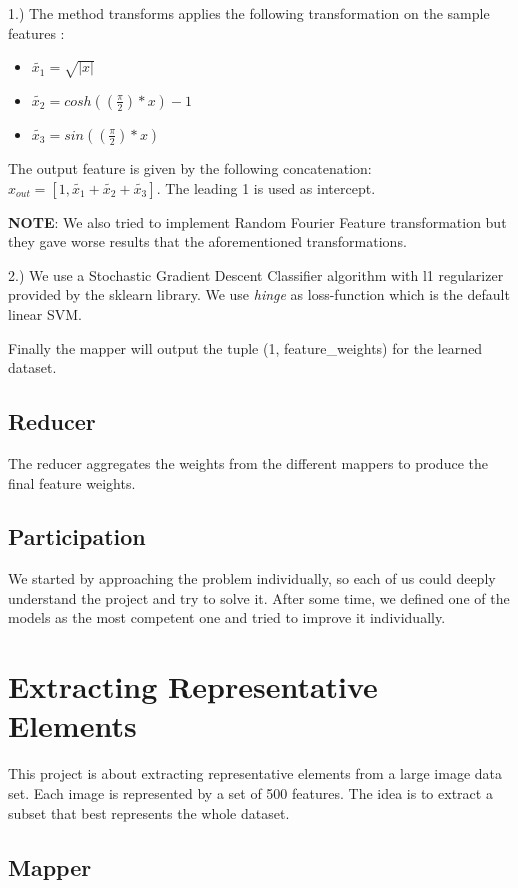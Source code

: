 \documentclass[a4paper, 11pt]{article}
\begin{document}
1.) The method transforms applies the following transformation on the sample features :
\begin{itemize}
\item $\widetilde{x_1} = \sqrt{|x|}$
\item $\widetilde{x_2} = cosh((\frac{\pi}{2})*x) - 1$
\item $\widetilde{x_3} = sin((\frac{\pi}{2})*x)$
\end{itemize}
The output feature is given by the following concatenation: $x_{out} = [1, \widetilde{x_1} + \widetilde{x_2} + \widetilde{x_3}]$. The leading 1 is used as intercept.

\textbf{NOTE}: We also tried to implement Random Fourier Feature transformation but they gave worse results that the aforementioned transformations.

2.) We use a Stochastic Gradient Descent Classifier algorithm with l1 regularizer provided by the sklearn library. We use \textit{hinge} as loss-function which is the default linear SVM.

Finally the mapper will output the tuple (1, feature\_weights) for the learned dataset.

\subsection{Reducer}

The reducer aggregates the weights from the different mappers to produce the final feature weights.

\subsection{Participation}

We started by approaching the problem individually, so each of us could deeply understand the project and try to solve it. After some time, we defined one of the models as the most competent one and tried to improve it individually.


\newpage


\section*{Extracting Representative Elements} 
This project is about extracting representative elements from a large image data set. Each image is represented by a set of 500 features. The idea is to extract a subset that best represents the whole dataset.

\subsection{Mapper}
\end{document}
